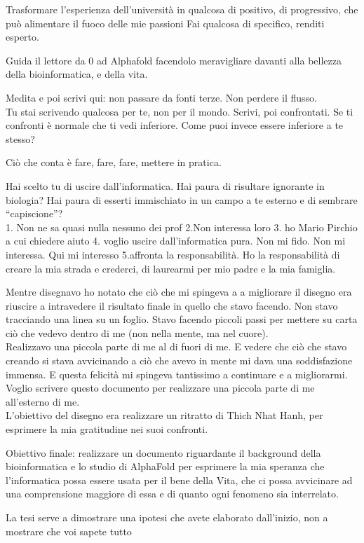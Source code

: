 Trasformare l’esperienza dell’università in qualcosa di positivo, di progressivo, che può alimentare il fuoco delle mie passioni
Fai qualcosa di specifico, renditi esperto.\newline

Guida il lettore da 0 ad Alphafold facendolo meravigliare davanti alla bellezza della bioinformatica, e della vita.\newline

Medita e poi scrivi qui: non passare da fonti terze. Non perdere il flusso.\\
Tu stai scrivendo qualcosa per te, non per il mondo. Scrivi, poi confrontati. Se ti confronti è normale che ti vedi inferiore. Come puoi invece essere inferiore a te stesso? \newline

Ciò che conta è fare, fare, fare, mettere in pratica.\newline

Hai scelto tu di uscire dall’informatica. Hai paura di risultare ignorante in biologia? Hai paura di esserti immischiato in un campo a te esterno e di sembrare “capiscione”? \\
1. Non ne sa quasi nulla nessuno dei prof 2.Non interessa loro 3. ho Mario Pirchio a cui chiedere aiuto 4. voglio uscire dall’informatica pura. Non mi fido. Non mi interessa. Qui mi interesso 5.affronta la responsabilità. Ho la responsabilità di creare la mia strada e crederci, di laurearmi per mio padre e la mia famiglia.\newline

Mentre disegnavo ho notato che ciò che mi spingeva a a migliorare il disegno era riuscire a intravedere il risultato finale in quello che stavo facendo. Non stavo tracciando una linea su un foglio. Stavo facendo piccoli passi per mettere su carta ciò che vedevo dentro di me (non nella mente, ma nel cuore).\\ Realizzavo una piccola parte di me al di fuori di me. E vedere che ciò che stavo creando si stava avvicinando a ciò che avevo in mente mi dava una soddisfazione immensa. E questa felicità mi spingeva tantissimo a continuare e a migliorarmi.\\
Voglio scrivere questo documento per realizzare una piccola parte di me all’esterno di me.\\
L’obiettivo del disegno era realizzare un ritratto di Thich Nhat Hanh, per esprimere la mia gratitudine nei suoi confronti.\newline

Obiettivo finale: realizzare un documento riguardante il background della bioinformatica e lo studio di AlphaFold per esprimere la mia speranza che l’informatica possa essere usata per il bene della Vita, che ci possa avvicinare ad una comprensione maggiore di essa e di quanto ogni fenomeno sia interrelato.\newline

La tesi serve a dimostrare una ipotesi che avete elaborato dall’inizio, non a mostrare che voi sapete tutto
\clearpage